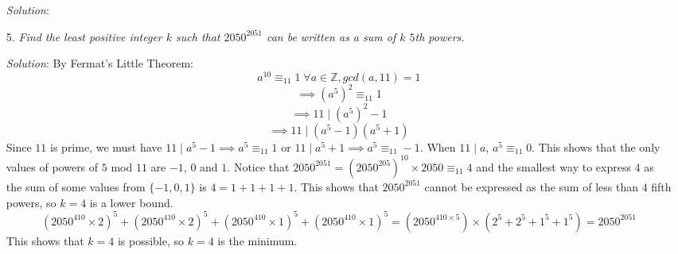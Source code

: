 \documentclass{article}
\begin{document}
\begin{enumerate}[1.]
\textit{Solution}:
\vspace{6.81mm}

\item[5.] %
\textit{Find the least positive integer $k$ such that $2050^{2051}$ can be written as a sum of $k$ $5$th powers.}

\textit{Solution}: 
By Fermat's Little Theorem: 
$$a^{10} \equiv _{11} 1 \; \forall a \in \mathbb{Z}, gcd(a, 11) = 1$$ 
$$\implies (a^5)^2 \equiv _{11} 1$$
$$\implies 11 \mid (a^5)^2 - 1$$
$$\implies 11 \mid (a^5 - 1)(a^5 + 1)$$
Since $11$ is prime, we must have $11 \mid a^5 - 1 \implies a^5 \equiv _{11} 1$ or $11 \mid a^5 + 1 \implies a^5 \equiv _{11} -1$. When $11 \mid a$, $a^5 \equiv _{11} 0$.
This shows that the only values of powers of $5$ mod $11$ are $-1$, $0$ and $1$. Notice that $2050^{2051} = (2050^{205})^{10} \times 2050 \equiv _{11} 4$ and the smallest way to express $4$ as the sum of some values from $\{-1, 0, 1\}$ is $4 = 1 + 1 + 1 + 1$.
This shows that $2050^{2051}$ cannot be expressed as the sum of less than $4$ fifth powers, so $k = 4$ is a lower bound.
$$(2050^{410} \times 2)^5 + (2050^{410} \times 2)^5 + (2050^{410} \times 1)^5 + (2050^{410} \times 1)^5 = (2050^{410 \times 5}) \times (2^5 + 2^5 + 1^5 + 1^5) = 2050^{2051}$$
This shows that $k = 4$ is possible, so $k = 4$ is the minimum.

\end{enumerate}
\end{document}
